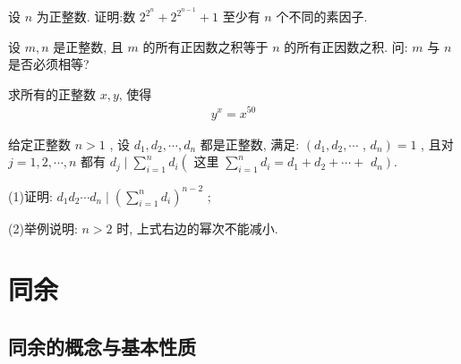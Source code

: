 \documentclass[aspectratio=169]{ctexbeamer}
\theoremstyle{definition}
\begin{document}
\begin{frame}[t]
	\begin{example}
		设 $n$ 为正整数. 证明:数 $2^{2^{n}}+2^{2^{n-1}}+1$ 至少有 $n$ 个不同的素因子.
	\end{example}
\end{frame}

\begin{frame}[t]
	\begin{example}
		设 $m ,  n$ 是正整数, 且 $m$ 的所有正因数之积等于 $n$ 的所有正因数之积. 问: $m$ 与 $n$ 是否必须相等?
	\end{example}
\end{frame}

\begin{frame}[t]
	\begin{example}
		求所有的正整数 $x, y$, 使得
		\begin{align*}
			y^{x}=x^{50}
		\end{align*}
	\end{example}
\end{frame}

\begin{frame}[t]
	\begin{example}
		给定正整数 $n>1$ , 设 $d_{1}, d_{2}, \cdots, d_{n}$ 都是正整数, 满足:  $\left(d_{1}, d_{2}, \cdots\right.$ ,  $\left.d_{n}\right)=1$ , 且对 $j=1,2, \cdots, n$ 都有 $d_{j} \mid \sum_{i=1}^{n} d_{i}\left(\right.$ 这里 $\sum_{i=1}^{n} d_{i}=d_{1}+d_{2}+\cdots+$ $\left.d_{n}\right)$.

		(1)证明: $d_{1} d_{2} \cdots d_{n} \mid\left(\sum_{i=1}^{n} d_{i}\right)^{n-2}$ ;

		(2)举例说明:  $n>2$ 时, 上式右边的幂次不能减小.
	\end{example}
\end{frame}
\section{同余}
\subsection{同余的概念与基本性质}
\end{document}
